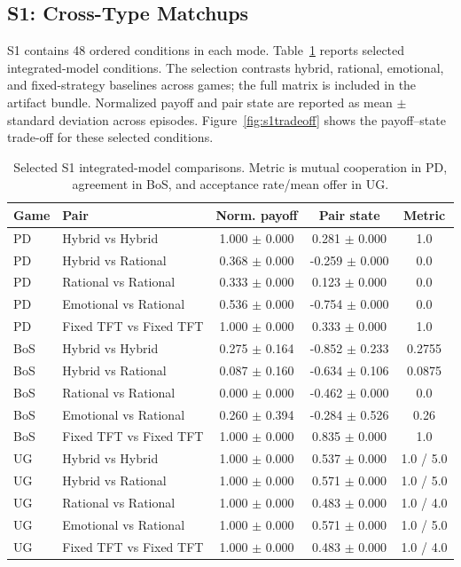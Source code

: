 \documentclass[runningheads]{llncs}
\begin{document}
\subsection{S1: Cross-Type Matchups}
S1 contains 48 ordered conditions in each mode. Table~\ref{tab:s1} reports selected integrated-model conditions. The selection contrasts hybrid, rational, emotional, and fixed-strategy baselines across games; the full matrix is included in the artifact bundle. Normalized payoff and pair state are reported as mean $\pm$ standard deviation across episodes. Figure~\ref{fig:s1tradeoff} shows the payoff--state trade-off for these selected conditions.

\begin{table}[t]
\centering
\caption{Selected S1 integrated-model comparisons. Metric is mutual cooperation in PD, agreement in BoS, and acceptance rate/mean offer in UG.}
\label{tab:s1}
\scriptsize
\begin{tabular}{llccc}
\toprule
Game & Pair & Norm. payoff & Pair state & Metric \\
\midrule
PD & Hybrid vs Hybrid & 1.000 $\pm$ 0.000 & 0.281 $\pm$ 0.000 & 1.0 \\
PD & Hybrid vs Rational & 0.368 $\pm$ 0.000 & -0.259 $\pm$ 0.000 & 0.0 \\
PD & Rational vs Rational & 0.333 $\pm$ 0.000 & 0.123 $\pm$ 0.000 & 0.0 \\
PD & Emotional vs Rational & 0.536 $\pm$ 0.000 & -0.754 $\pm$ 0.000 & 0.0 \\
PD & Fixed TFT vs Fixed TFT & 1.000 $\pm$ 0.000 & 0.333 $\pm$ 0.000 & 1.0 \\
BoS & Hybrid vs Hybrid & 0.275 $\pm$ 0.164 & -0.852 $\pm$ 0.233 & 0.2755 \\
BoS & Hybrid vs Rational & 0.087 $\pm$ 0.160 & -0.634 $\pm$ 0.106 & 0.0875 \\
BoS & Rational vs Rational & 0.000 $\pm$ 0.000 & -0.462 $\pm$ 0.000 & 0.0 \\
BoS & Emotional vs Rational & 0.260 $\pm$ 0.394 & -0.284 $\pm$ 0.526 & 0.26 \\
BoS & Fixed TFT vs Fixed TFT & 1.000 $\pm$ 0.000 & 0.835 $\pm$ 0.000 & 1.0 \\
UG & Hybrid vs Hybrid & 1.000 $\pm$ 0.000 & 0.537 $\pm$ 0.000 & 1.0 / 5.0 \\
UG & Hybrid vs Rational & 1.000 $\pm$ 0.000 & 0.571 $\pm$ 0.000 & 1.0 / 5.0 \\
UG & Rational vs Rational & 1.000 $\pm$ 0.000 & 0.483 $\pm$ 0.000 & 1.0 / 4.0 \\
UG & Emotional vs Rational & 1.000 $\pm$ 0.000 & 0.571 $\pm$ 0.000 & 1.0 / 5.0 \\
UG & Fixed TFT vs Fixed TFT & 1.000 $\pm$ 0.000 & 0.483 $\pm$ 0.000 & 1.0 / 4.0 \\
\bottomrule
\end{tabular}
\end{table}
\end{document}
